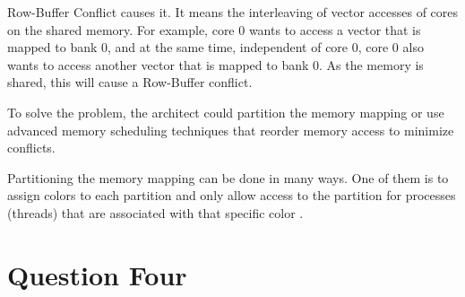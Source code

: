 \documentclass[12pt]{article}
\begin{document}
\begin{enumerate}[label=\alph*.]
Row-Buffer Conflict causes it. It means the interleaving of vector accesses of cores on the shared memory. For example, core 0 wants to access a vector that is mapped to bank 0, and at the same time, independent of core 0, core 0 also wants to access another vector that is mapped to bank 0. As the memory is shared, this will cause a Row-Buffer conflict.


To solve the problem, the architect could partition the memory mapping or use advanced memory scheduling techniques that reorder memory access to minimize conflicts.

Partitioning the memory mapping can be done in many ways. One of them is to assign colors to each partition and only allow access to the partition for processes (threads) that are associated with that specific color \cite{AhrenInvestigatingDB}.
\end{enumerate}


\nocite{*}




\newpage

\section{Question Four}

\newpage
\end{document}
